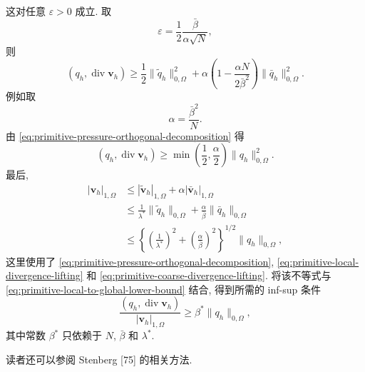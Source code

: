 \begin{Proof}
这对任意 $\varepsilon>0$ 成立. 取
\[
\varepsilon=\frac12\frac{\bar\beta}{\alpha\sqrt N},
\]
则
\[
(q_h,\operatorname{div}\mathbf v_h)
\geq\frac12\|\tilde q_h\|_{0,\Omega}^2
+\alpha\left(1-\frac{\alpha N}{2\bar\beta^2}\right)
\|\bar q_h\|_{0,\Omega}^2.
\]
例如取
\[
\alpha=\frac{\bar\beta^2}{N}.
\]
由 \eqref{eq:primitive-pressure-orthogonal-decomposition} 得
\begin{equation}\label{eq:primitive-local-to-global-lower-bound}
(q_h,\operatorname{div}\mathbf v_h)
\geq\min\left(\frac12,\frac\alpha2\right)
\|q_h\|_{0,\Omega}^2.
\end{equation}
最后,
\[
\begin{split}
|\mathbf v_h|_{1,\Omega}
&\leq|\tilde{\mathbf v}_h|_{1,\Omega}
+\alpha|\bar{\mathbf v}_h|_{1,\Omega}\\
&\leq\frac{1}{\lambda^*}\|\tilde q_h\|_{0,\Omega}
+\frac{\alpha}{\bar\beta}\|\bar q_h\|_{0,\Omega}\\
&\leq\left\{
\left(\frac{1}{\lambda^*}\right)^2
+\left(\frac\alpha{\bar\beta}\right)^2
\right\}^{1/2}\|q_h\|_{0,\Omega},
\end{split}
\]
这里使用了 \eqref{eq:primitive-pressure-orthogonal-decomposition},
\eqref{eq:primitive-local-divergence-lifting} 和
\eqref{eq:primitive-coarse-divergence-lifting}. 将该不等式与
\eqref{eq:primitive-local-to-global-lower-bound} 结合, 得到所需的 inf-sup 条件
\[
\frac{(q_h,\operatorname{div}\mathbf v_h)}{|\mathbf v_h|_{1,\Omega}}
\geq\beta^*\|q_h\|_{0,\Omega},
\]
其中常数 $\beta^*$ 只依赖于 $N$, $\bar\beta$ 和 $\lambda^*$.
\end{Proof}

读者还可以参阅 Stenberg [75] 的相关方法.
